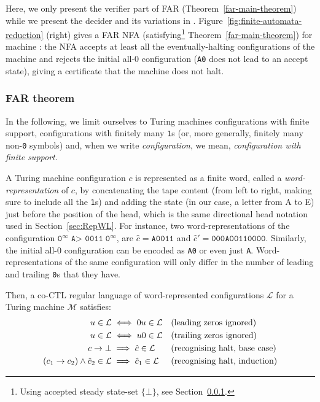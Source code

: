 Here, we only present the verifier part of FAR (Theorem~\ref{far-main-theorem}) while we present the decider and its variations in \cite{bbchallenge_part1}. Figure~\ref{fig:finite-automata-reduction} (right) gives a FAR NFA (\ie satisfying\footnote{Using accepted steady state-set $\{\bot\}$, see Section~\ref{sec:FAR:theorem}.} Theorem~\ref{far-main-theorem}) for machine : the NFA accepts at least all the eventually-halting configurations of the machine and rejects the initial all-0 configuration (\ie \texttt{A0} does not lead to an accept state), giving a certificate that the machine does not halt.

\subsubsection{FAR theorem}\label{sec:FAR:theorem}

In the following, we limit ourselves to Turing machines configurations with finite support, \ie configurations with finitely many \texttt{1}s (or, more generally, finitely many non-\texttt{0} symbols) and, when we write \textit{configuration}, we mean, \textit{configuration with finite support}.

A Turing machine configuration $c$ is represented as a finite word, called a \textit{word-representation} of $c$, by concatenating the tape content (from left to right, making sure to include all the \texttt{1}s) and adding the state (in our case, a letter from A to E) just before the position of the head, which is the same directional head notation used in Section~\ref{sec:RepWL}. For instance, two word-representations of the configuration $\texttt{0}^\infty \; \texttt{A> 0011} \; \texttt{0}^\infty$, are $\hat{c} = \texttt{A0011}$ and $\hat{c}' = \texttt{000A00110000}$. Similarly, the initial all-0 configuration can be encoded as \texttt{A0} or even just \texttt{A}. Word-representations of the same configuration will only differ in the number of leading and trailing \texttt{0}s that they have.


Then, a co-CTL regular language of word-represented configurations $\mathcal{L}$ for a Turing machine $\mathcal{M}$ satisfies:
\begin{align}
    u \in \mathcal{L}                               & \iff 0u \in \mathcal{L}           &  & \text{(leading zeros ignored)}
    \label{eq:lzignore}
    \\
    u \in \mathcal{L}                               & \iff u0 \in \mathcal{L}           &  & \text{(trailing zeros ignored)}
    \label{eq:tzignore}
    \\
    c\to\bot                                    & \implies \hat{c} \in \mathcal{L}  &  & \text{(recognising halt, base case)} \nonumber \\
    (c_1\to c_2)\land \hat{c}_2 \in \mathcal{L} & \implies\hat{c}_1 \in \mathcal{L} &  & \text{(recognising halt, induction)} \nonumber
\end{align}


